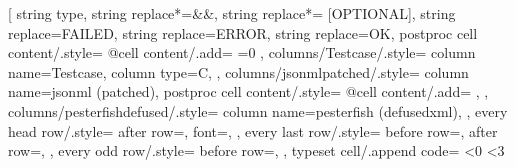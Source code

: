 \usepackage{colortbl}
\usepackage{makecell}
\usepackage{booktabs}
\usepackage{threeparttable}
\usepackage{pifont}
\newcommand{\cmark}{\ding{51}}%
\newcommand{\xmark}{\ding{55}}%
\usepackage[T1]{fontenc}
\usepackage{rubfonts2009}

  \begin{threeparttable}
\pgfplotstabletypeset[
    string type,
    string replace*={&}{\&},
    string replace*={ [OPTIONAL]}{},
    string replace={FAILED}{},
    string replace={ERROR}{\xmark},
    string replace={OK}{\cmark},
    postproc cell content/.style={%
        @cell content/.add={
            \ifnum{}=0
                \color{white}
            \fi
           }{}
    },
    columns/Testcase/.style={
        column name=Testcase,
        column type={C},
    },
    columns/jsonmlpatched/.style={
        column name={jsonml (patched)},
        postproc cell content/.style={%
            @cell content/.add={
               }{}
        },
    },
    columns/pesterfishdefused/.style={
        column name={pesterfish (defusedxml)},
    },
    every head row/.style={
        after row=\toprule,
        font=\selectfont,
    },
    every last row/.style={
        before row=\midrule,
        after row=\bottomrule,
    },
    every odd row/.style={
        before row={},
    },
    typeset cell/.append code={%
        \ifnum\pgfplotstablerow<0%
            \ifnum\pgfplotstablecol<3
            \else
}
\end{threeparttable}
